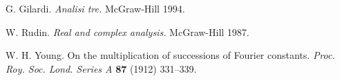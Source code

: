 \documentclass[12pt]{article}
\begin{document}
\begin{thebibliography}{99}

G. Gilardi.
\textit{Analisi tre.}
McGraw-Hill 1994.

W. Rudin.
\textit{Real and complex analysis.}
McGraw-Hill 1987.

W. H. Young.
On the multiplication of successions of Fourier constants.
\textit{Proc. Roy. Soc. Lond. Series A} \textbf{87} (1912) 331--339.

\end{thebibliography}

\end{document}
